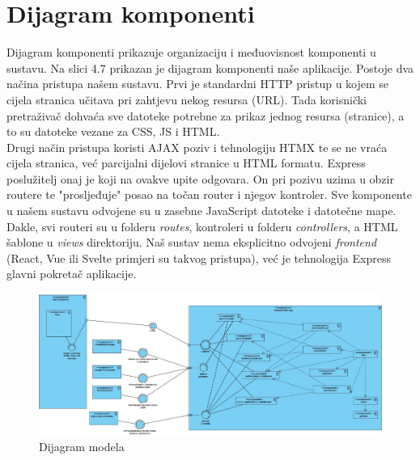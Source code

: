 			\eject
		\section{Dijagram komponenti}
		
        Dijagram komponenti prikazuje organizaciju i međuovisnost komponenti u sustavu. Na slici 4.7 prikazan je dijagram komponenti naše aplikacije. 
        Postoje dva načina pristupa našem sustavu. Prvi je standardni HTTP pristup u kojem se cijela stranica učitava pri zahtjevu nekog resursa (URL). Tada korisnički pretraživač dohvaća sve datoteke potrebne za prikaz jednog resursa (stranice), a to su datoteke vezane za CSS, JS i HTML.
        \newline
        \\
        Drugi način pristupa koristi AJAX poziv i tehnologiju HTMX te se ne vraća cijela stranica, već parcijalni dijelovi stranice u HTML formatu. Express poslužitelj onaj je koji na ovakve upite odgovara. On pri pozivu  uzima u obzir routere te "prosljeđuje" posao na točan router i njegov kontroler. Sve komponente u našem sustavu odvojene su u zasebne JavaScript datoteke i datotečne mape.
        \newline
        \\
        Dakle, svi routeri su u folderu \textit{routes}, kontroleri u folderu \textit{controllers}, a HTML šablone u \textit{views} direktoriju. Naš sustav nema eksplicitno odvojeni \textit{frontend} (React, Vue ili  Svelte primjeri su takvog pristupa), već je tehnologija Express glavni pokretač aplikacije.

        \begin{figure}[H]
            \includegraphics[width=1.1\textwidth]{dijagrami/DijagamKomponenti.jpg} 
            \centering
            \caption{Dijagram modela}
            \label{fig:class_diagram}
        \end{figure}	
            
            \eject
			